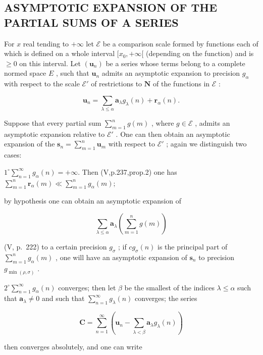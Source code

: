 \subsection{ASYMPTOTIC EXPANSION OF THE PARTIAL SUMS OF A SERIES}

For \(x\) real tending to \(+\infty\) let \(\mathcal{E}\) be a comparison scale formed by functions each of which is defined on a whole interval \([x_0, +\infty[\) (depending on the function) and is \(\geqslant 0\) on this interval. Let \((\mathbf{u}_n)\) be a series whose terms belong to a complete normed space \(E\) , such that \(\mathbf{u}_n\) admits an asymptotic expansion to precision \(g_\alpha\) with respect to the scale \(\mathcal{E}'\) of restrictions to \(\mathbf{N}\) of the functions in \(\mathcal{E}\) :

\[
\mathbf {u} _ {n} = \sum_ {\lambda \leqslant \alpha} \mathbf {a} _ {\lambda} g _ {\lambda} (n) + \mathbf {r} _ {\alpha} (n).
\]

Suppose that every partial sum \(\sum_{m=1}^{n} g(m)\) , where \(g \in \mathcal{E}\) , admits an asymptotic expansion relative to \(\mathcal{E}'\) . One can then obtain an asymptotic expansion of the \(\mathbf{s}_n = \sum_{m=1}^{n} \mathbf{u}_m\) with respect to \(\mathcal{E}'\) ; again we distinguish two cases:

\(1^{\circ}\sum_{n = 1}^{\infty}g_{\alpha}(n) = +\infty .\) Then (V,p.237,prop.2) one has \(\sum_{m = 1}^{n}\mathbf{r}_{\alpha}(m)\ll \sum_{m = 1}^{n}g_{\alpha}(m);\)

by hypothesis one can obtain an asymptotic expansion of

\[
\sum_ {\lambda \leqslant \alpha} \mathbf {a} _ {\lambda} \left(\sum_ {m = 1} ^ {n} g (m)\right)
\]

(V, p.~222) to a certain precision \(g_{\sigma}\) ; if \(cg_{\sigma}(n)\) is the principal part of \(\sum_{m=1}^{n} g_{\alpha}(m)\) , one will have an asymptotic expansion of \(\mathbf{s}_n\) to precision \(g_{\min(\rho, \sigma)}\) .

\(2^{\circ}\sum_{n = 1}^{\infty}g_{\alpha}(n)\) converges; then let \(\beta\) be the smallest of the indices \(\lambda \leqslant \alpha\) such that \(\mathbf{a}_{\lambda}\neq 0\) and such that \(\sum_{n = 1}^{\infty}g_{\lambda}(n)\) converges; the series

\[
\mathbf {C} = \sum_ {n = 1} ^ {\infty} \left(\mathbf {u} _ {n} - \sum_ {\lambda <   \beta} \mathbf {a} _ {\lambda} g _ {\lambda} (n)\right)
\]

then converges absolutely, and one can write

